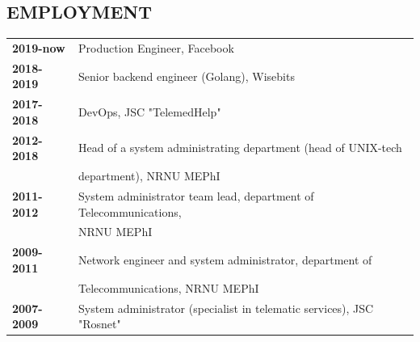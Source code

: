 \begin{resume}
\section{EMPLOYMENT}
\vspace{0.1in} 
\begin{tabular}{ll}
    {\bf 2019-now}  & Production Engineer, Facebook\\
    {\bf 2018-2019} & Senior backend engineer (Golang), Wisebits\\
    {\bf 2017-2018} & DevOps, JSC "TelemedHelp"\\
    {\bf 2012-2018} & Head of a system administrating department (head of UNIX-tech\\
                    & department), NRNU MEPhI\\
    {\bf 2011-2012} & System administrator team lead, department of Telecommunications,\\
                    & NRNU MEPhI\\
    {\bf 2009-2011} & Network engineer and system administrator, department of \\
                    & Telecommunications, NRNU MEPhI\\
    {\bf 2007-2009} & System administrator (specialist in telematic services), JSC "Rosnet"\\
\end{tabular}


\end{resume}
